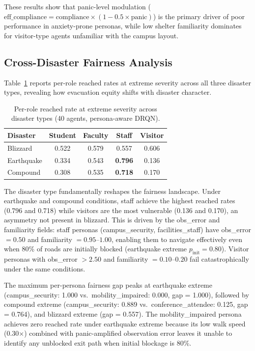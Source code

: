 \documentclass[11pt]{article}
\begin{document}
These results show that panic-level modulation ($\text{eff\_compliance} = \text{compliance} \times (1 - 0.5 \times \text{panic})$) is the primary driver of poor performance in anxiety-prone personas, while low shelter familiarity dominates for visitor-type agents unfamiliar with the campus layout.

\subsection{Cross-Disaster Fairness Analysis}

Table~\ref{tab:cross_fairness} reports per-role reached rates at extreme severity across all three disaster types, revealing how evacuation equity shifts with disaster character.

\begin{table}[h]
\centering
\caption{Per-role reached rate at extreme severity across disaster types (40 agents, persona-aware DRQN).}
\label{tab:cross_fairness}
\begin{tabular}{lcccc}
\toprule
\textbf{Disaster} & \textbf{Student} & \textbf{Faculty} & \textbf{Staff} & \textbf{Visitor} \\
\midrule
Blizzard   & 0.522 & 0.579 & 0.557 & 0.606 \\
Earthquake & 0.334 & 0.543 & \textbf{0.796} & 0.136 \\
Compound   & 0.308 & 0.535 & \textbf{0.718} & 0.170 \\
\bottomrule
\end{tabular}
\end{table}

The disaster type fundamentally reshapes the fairness landscape. Under earthquake and compound conditions, staff achieve the highest reached rates (0.796 and 0.718) while visitors are the most vulnerable (0.136 and 0.170), an asymmetry not present in blizzard. This is driven by the obs\_error and familiarity fields: staff personas (campus\_security, facilities\_staff) have obs\_error $= 0.50$ and familiarity $= 0.95$--$1.00$, enabling them to navigate effectively even when 80\% of roads are initially blocked (earthquake extreme $p_{\mathrm{init}} = 0.80$). Visitor personas with obs\_error $> 2.50$ and familiarity $= 0.10$--$0.20$ fail catastrophically under the same conditions.

The maximum per-persona fairness gap peaks at earthquake extreme (campus\_security: 1.000 vs.\ mobility\_impaired: 0.000, gap = 1.000), followed by compound extreme (campus\_security: 0.889 vs.\ conference\_attendee: 0.125, gap = 0.764), and blizzard extreme (gap = 0.557). The mobility\_impaired persona achieves zero reached rate under earthquake extreme because its low walk speed (0.30$\times$) combined with panic-amplified observation error leaves it unable to identify any unblocked exit path when initial blockage is 80\%.
\end{document}
